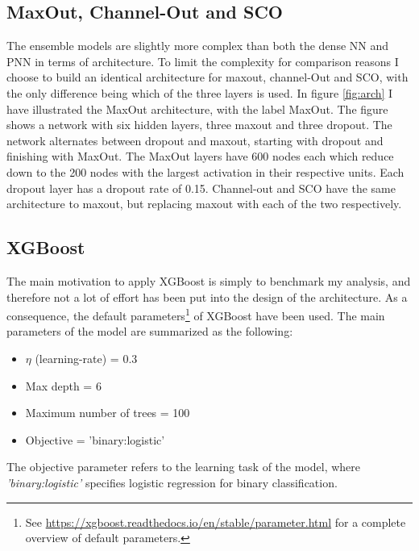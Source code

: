 \subsection*{MaxOut, Channel-Out and SCO}
The ensemble models are slightly more complex than both the dense \ac{NN} and \ac{PNN} in terms of architecture. To limit the complexity for comparison reasons
I choose to build an identical architecture for maxout, channel-Out and \ac{SCO}, with the only difference being which of the three layers is used.  
In figure \ref{fig:arch} I have illustrated the MaxOut architecture, with the label MaxOut. The figure shows a network with six hidden layers, 
three maxout and three dropout. The network alternates between dropout and maxout, starting with dropout and finishing with MaxOut. The MaxOut layers 
have 600 nodes each which reduce down to the 200 nodes with the largest activation in their respective units. Each dropout layer has a dropout 
rate of 0.15. Channel-out and \ac{SCO} have the same architecture to maxout, but replacing maxout with each of the two respectively.  

\subsection*{XGBoost}\label{subsec:XGBoost}
The main motivation to apply XGBoost is simply to benchmark my analysis, and therefore not a lot of effort has been put into the design of the 
architecture. As a consequence, the default parameters\footnote{See \href{https://xgboost.readthedocs.io/en/stable/parameter.html}
{https://xgboost.readthedocs.io/en/stable/parameter.html}
for a complete overview of default parameters.} of XGBoost have been used. The main parameters of the model are summarized as the following:
\begin{itemize}
    \item $\eta$ (learning-rate) = 0.3
    \item Max depth = 6
    \item Maximum number of trees = 100
    \item Objective = 'binary:logistic'
\end{itemize}
The objective parameter refers to the learning task of the model, where \emph{'binary:logistic'} specifies logistic regression for binary classification.

